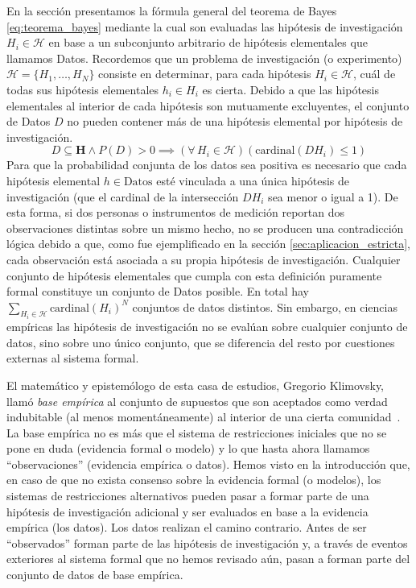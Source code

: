 \documentclass[a4paper,11pt]{book}
\theoremstyle{definition}
\begin{document}
En la secci\'on \emph{} presentamos la f\'ormula general del teorema de Bayes \eqref{eq:teorema_bayes} mediante la cual son evaluadas las hip\'otesis de investigaci\'on $H_i \in \mathcal{H}$ en base a un subconjunto arbitrario de hip\'otesis elementales que llamamos Datos.
%
Recordemos que un problema de investigaci\'on (o experimento) $\mathcal{H} = \{H_1, \dots, H_N\}$ consiste en determinar, para cada hip\'otesis $H_i \in \mathcal{H}$, cu\'al de todas sus hip\'otesis elementales $h_i \in H_i$ es cierta.
%
Debido a que las hip\'otesis elementales al interior de cada hip\'otesis son mutuamente excluyentes, el conjunto de Datos $D$ no pueden contener m\'as de una hip\'otesis elemental por hip\'otesis de investigaci\'on.
%
\begin{equation*}
D \subseteq \textbf{H} \land P(D)> 0 \implies (\forall \, H_i \in \mathcal{H})(\text{cardinal}(DH_i) \leq 1)
\end{equation*}
%
Para que la probabilidad conjunta de los datos sea positiva es necesario que cada hip\'otesis elemental $h\in \text{Datos}$ est\'e vinculada a una \'unica hip\'otesis de investigaci\'on (que el cardinal de la intersecci\'on $DH_i$ sea menor o igual a 1).
%
De esta forma, si dos personas o instrumentos de medici\'on reportan dos observaciones distintas sobre un mismo hecho, no se producen una contradicci\'on l\'ogica debido a que, como fue ejemplificado en la secci\'on \ref{sec:aplicacion_estricta}, cada observaci\'on est\'a asociada a su propia hip\'otesis de investigaci\'on.
%
Cualquier conjunto de hip\'otesis elementales que cumpla con esta definici\'on puramente formal constituye un conjunto de Datos posible.
%
En total hay $\sum_{H_i \in \mathcal{H}} \text{cardinal}(H_i)^N$ conjuntos de datos distintos.
%
Sin embargo, en ciencias emp\'iricas las hip\'otesis de investigaci\'on no se eval\'uan sobre cualquier conjunto de datos, sino sobre uno \'unico conjunto, que se diferencia del resto por cuestiones externas al sistema formal.


El matem\'atico y epistem\'ologo de esta casa de estudios, Gregorio Klimovsky, llam\'o \emph{base emp\'irica} al conjunto de supuestos que son aceptados como verdad indubitable (al menos moment\'aneamente) al interior de una cierta comunidad~\cite{klimovsky1994-desventuras}.
%
La base emp\'irica no es m\'as que el sistema de restricciones iniciales que no se pone en duda (evidencia formal o modelo) y lo que hasta ahora llamamos ``observaciones'' (evidencia emp\'irica o datos).
%
Hemos visto en la introducci\'on que, en caso de que no exista consenso sobre la evidencia formal (o modelos), los sistemas de restricciones alternativos pueden pasar a formar parte de una hip\'otesis de investigaci\'on adicional y ser evaluados en base a la evidencia emp\'irica (los datos).
%
Los datos realizan el camino contrario.
%
Antes de ser ``observados'' forman parte de las hip\'otesis de investigaci\'on y, a trav\'es de eventos exteriores al sistema formal que no hemos revisado a\'un, pasan a forman parte del conjunto de datos de base emp\'irica.
\end{document}
